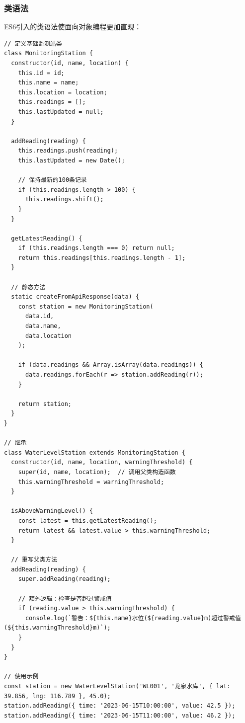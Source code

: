 \subsubsection{类语法}\label{ux7c7bux8bedux6cd5}

ES6引入的类语法使面向对象编程更加直观：

\begin{lstlisting}
// 定义基础监测站类
class MonitoringStation {
  constructor(id, name, location) {
    this.id = id;
    this.name = name;
    this.location = location;
    this.readings = [];
    this.lastUpdated = null;
  }

  addReading(reading) {
    this.readings.push(reading);
    this.lastUpdated = new Date();

    // 保持最新的100条记录
    if (this.readings.length > 100) {
      this.readings.shift();
    }
  }

  getLatestReading() {
    if (this.readings.length === 0) return null;
    return this.readings[this.readings.length - 1];
  }

  // 静态方法
  static createFromApiResponse(data) {
    const station = new MonitoringStation(
      data.id, 
      data.name, 
      data.location
    );
    
    if (data.readings && Array.isArray(data.readings)) {
      data.readings.forEach(r => station.addReading(r));
    }
    
    return station;
  }
}

// 继承
class WaterLevelStation extends MonitoringStation {
  constructor(id, name, location, warningThreshold) {
    super(id, name, location);  // 调用父类构造函数
    this.warningThreshold = warningThreshold;
  }

  isAboveWarningLevel() {
    const latest = this.getLatestReading();
    return latest && latest.value > this.warningThreshold;
  }

  // 重写父类方法
  addReading(reading) {
    super.addReading(reading);
    
    // 额外逻辑：检查是否超过警戒值
    if (reading.value > this.warningThreshold) {
      console.log(`警告：${this.name}水位(${reading.value}m)超过警戒值(${this.warningThreshold}m)`);
    }
  }
}

// 使用示例
const station = new WaterLevelStation('WL001', '龙泉水库', { lat: 39.856, lng: 116.789 }, 45.0);
station.addReading({ time: '2023-06-15T10:00:00', value: 42.5 });
station.addReading({ time: '2023-06-15T11:00:00', value: 46.2 });
\end{lstlisting}

